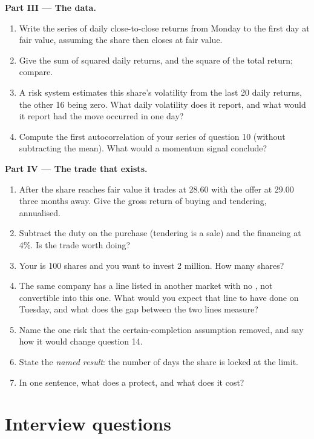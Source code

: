 \begin{problem}
\medskip\noindent\textbf{Part III --- The data.}
\begin{enumerate}[resume]
\item Write the series of daily close-to-close returns from Monday to the
first day at fair value, assuming the share then closes at fair value.
\item Give the sum of squared daily returns, and the square of the total
return; compare.
\item A risk system estimates this share's volatility from the last 20 daily
returns, the other 16 being zero. What daily volatility does it report, and
what would it report had the move occurred in one day?
\item Compute the first autocorrelation of your series of question 10
(without subtracting the mean). What would a momentum signal conclude?
\end{enumerate}

\medskip\noindent\textbf{Part IV --- The trade that exists.}
\begin{enumerate}[resume]
\item After the share reaches fair value it trades at 28.60 with the offer
at 29.00 three months away. Give the gross return of buying and tendering,
annualised.
\item Subtract the duty on the purchase (tendering is a sale) and the
financing at 4\%. Is the trade worth doing?
\item Your  is 100 shares and you want to invest 2 million. How many
shares?
\item The same company has a line listed in another market with no , not convertible into this one. What would you expect that line to have
done on Tuesday, and what does the gap between the two lines measure?
\item Name the one risk that the certain-completion assumption removed, and
say how it would change question 14.
\item State the \emph{named result}: the number of days the share is locked
at the limit.
\item In one sentence, what does a  protect, and what does it
cost?
\end{enumerate}
\end{problem}

\section{Interview questions}

